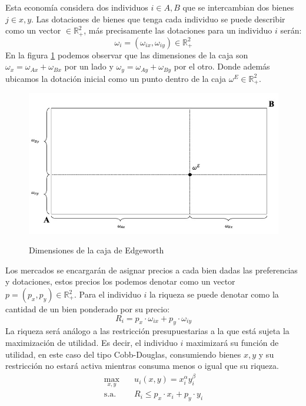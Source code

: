 Esta economía considera dos individuos $i \in A,B$ que se intercambian dos bienes $j \in x,y$. Las dotaciones de bienes que tenga cada individuo se puede describir como un vector $\in \mathbb{R}^2_+$, más precisamente las dotaciones para un individuo $i$ serán:
\begin{equation*}
    \omega_i = (\omega_{ix} , \omega_{iy}) \in \mathbb{R}^2_+
\end{equation*}
En la figura \ref{fig:caja dimensiones} podemos observar que las dimensiones de la caja son $\omega_x = \omega_{Ax} + \omega_{Bx}$ por un lado y $\omega_y = \omega_{Ay} + \omega_{By}$ por el otro. Donde además ubicamos la dotación inicial como un punto dentro de la caja $\omega^E \in \mathbb{R}^2_+$.
\begin{figure}
    \centering
    \caption{Dimensiones de la caja de Edgeworth}
    \includegraphics[width=\textwidth]{Figuras/EG Dotacion inicial.jpeg}
    \label{fig:caja dimensiones}
\end{figure}
Los mercados se encargarán de asignar precios a cada bien dadas las preferencias y dotaciones, estos precios los podemos denotar como un vector $p = (p_x, p_y) \in \mathbb{R}^2_+$. Para el individuo $i$ la riqueza se puede denotar como la cantidad de un bien ponderado por su precio: 
\begin{equation*}
    R_i = p_x \cdot \omega_{ix} + p_y \cdot \omega_{iy}
\end{equation*}
La riqueza será análogo a las restricción presupuestarias a la que está sujeta la maximización de utilidad. Es decir, el individuo $i$ maximizará su función de utilidad, en este caso del tipo Cobb-Douglas, consumiendo bienes $x,y$ y su restricción no estará activa mientras consuma menos o igual que su riqueza.
\begin{align*}
    \max_{x,y} &\quad u_i(x,y) = x_i^\alpha y_i^{\beta} \\
    \text{s.a.} &\quad R_i \leq p_x \cdot x_i + p_y \cdot y_i
\end{align*}
